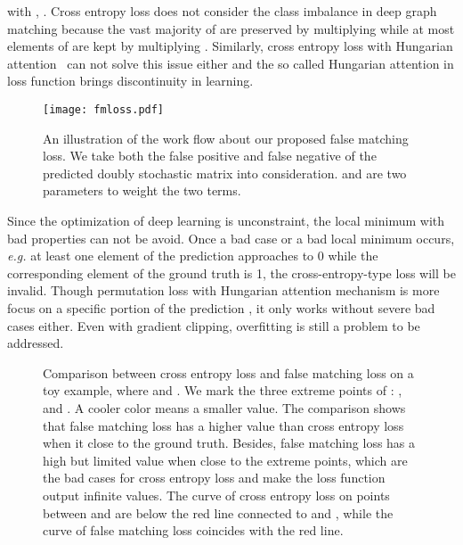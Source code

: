 \documentclass[final]{cvpr}
\begin{document}
with , . Cross entropy loss does not consider the class imbalance in deep graph matching because the vast majority of  are preserved by multiplying  while at most  elements of  are kept by multiplying . Similarly, cross entropy loss with Hungarian attention~\cite{yu2020learning} can not solve this issue either and the so called Hungarian attention in loss function brings discontinuity in learning.
\begin{figure}[t!]
\begin{center}
   \texttt{[image: fmloss.pdf]}
\end{center}
   \caption{An illustration of the work flow about our proposed false matching loss. We take both the false positive and false negative of the predicted doubly stochastic matrix into consideration.  and  are two parameters to weight the two terms.}
\label{fig:inner}
\vspace{-3mm}
\end{figure}

 Since the optimization of deep learning is unconstraint, the local minimum with bad properties can not be avoid. Once a bad case or a bad local minimum occurs, {\em e.g.} at least one element of the prediction  approaches to 0 while the corresponding element of the ground truth  is 1, the cross-entropy-type loss will be invalid. Though permutation loss with Hungarian attention mechanism is more focus on a specific portion of the prediction , it only works without severe bad cases either. Even with gradient clipping, overfitting is still a problem to be addressed.
\begin{figure}[t]
\centering
{}\centering
\caption{Comparison between cross entropy loss and false matching loss on a toy example, where  and . We mark the three extreme points of : ,  and . A cooler color means a smaller value. The comparison shows that false matching loss has a higher value than cross entropy loss when it close to the ground truth. Besides, false matching loss has a high but limited value when  close to the extreme points, which are the bad cases for cross entropy loss and make the loss function output infinite values. The curve of cross entropy loss on points between  and  are below the red line connected to  and , while the curve of false matching loss coincides with the red line.}
\label{fig:innercross}
\vspace{-2mm}
\end{figure}
\end{document}
